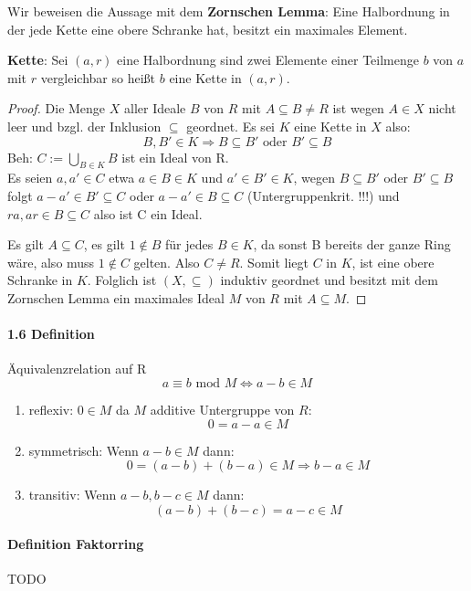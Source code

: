 \documentclass[a4paper]{article}
\begin{document}
Wir beweisen die Aussage mit dem \textbf{Zornschen Lemma}: Eine Halbordnung in der jede Kette eine obere Schranke hat, besitzt ein maximales Element. 
\smallskip

\textbf{Kette}: Sei $ (a,r) $ eine Halbordnung sind zwei Elemente einer Teilmenge $ b $ von $ a $ mit $ r $ vergleichbar 
so heißt $ b $ eine Kette in $ (a,r) $.

\begin{proof}
      Die Menge $ X $ aller Ideale $ B $ von $ R $ mit $ A \subseteq B \neq R $ ist wegen $ A \in X $
      nicht leer und bzgl. der Inklusion $ \subseteq $ geordnet.
      Es sei $ K $ eine Kette in $ X $ also:
      $$ B, B' \in K \Rightarrow B \subseteq B' \text{ oder } B' \subseteq B $$ 
      Beh: $ C := \bigcup_{B \in K} B $ ist ein Ideal von R. \\
      Es seien $ a, a' \in C $ etwa $ a \in B \in K $ und $ a' \in B' \in K $, wegen 
      $ B \subseteq B' \text{ oder } B' \subseteq B $ folgt $ a - a' \in B' \subseteq C $
      oder $ a - a' \in B \subseteq C $  (Untergruppenkrit. !!!) und $ r a, a r \in B \subseteq C $ also ist C ein Ideal.

      Es gilt $ A \subseteq C $, es gilt $ 1 \notin B $ für jedes $ B \in K $, da sonst B bereits der ganze Ring wäre, also 
      muss $ 1 \notin C $ gelten. Also $ C \neq R $. Somit liegt $ C $ in $ K $, ist eine obere Schranke in $ K $.
      Folglich ist $ (X,\subseteq) $ induktiv geordnet und besitzt mit dem Zornschen Lemma ein maximales Ideal $ M $ von $ R $ mit $ A \subseteq M $.
\end{proof}

\paragraph{1.6 Definition} Äquivalenzrelation auf R  %
$$ a \equiv b \text{ mod } M \iff a - b \in M $$
\begin{enumerate}
      \item reflexiv: $ 0 \in M  $ da $ M $ additive Untergruppe von $ R $: 
      $$ 0 =  a - a \in M $$
     \item symmetrisch: Wenn $ a - b \in M $ dann:
      $$  0 = (a - b) + (b - a) \in M \Rightarrow b - a \in M $$
     \item transitiv: Wenn $ a - b, b - c \in M $ dann:
      $$ (a - b) + (b - c) = a - c \in M $$
\end{enumerate}

\paragraph{Definition Faktorring} TODO
\end{document}
